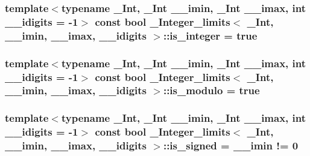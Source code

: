 \subsubsection[{is\+\_\+integer}]{\setlength{\rightskip}{0pt plus 5cm}template$<$typename \+\_\+\+Int, \+\_\+\+Int \+\_\+\+\_\+imin, \+\_\+\+Int \+\_\+\+\_\+imax, int \+\_\+\+\_\+idigits = -\/1$>$ const {\bf bool} {\bf \+\_\+\+Integer\+\_\+limits}$<$ \+\_\+\+Int, \+\_\+\+\_\+imin, \+\_\+\+\_\+imax, \+\_\+\+\_\+idigits $>$\+::is\+\_\+integer = {\bf true}\hspace{0.3cm}{\ttfamily [static]}}\label{class__Integer__limits_a912f15c4744dcbe94c9c98a09d144c59}
\hypertarget{class__Integer__limits_ad253b6f38a22b1584bbacf47fda759b3}{}
\subsubsection[{is\+\_\+modulo}]{\setlength{\rightskip}{0pt plus 5cm}template$<$typename \+\_\+\+Int, \+\_\+\+Int \+\_\+\+\_\+imin, \+\_\+\+Int \+\_\+\+\_\+imax, int \+\_\+\+\_\+idigits = -\/1$>$ const {\bf bool} {\bf \+\_\+\+Integer\+\_\+limits}$<$ \+\_\+\+Int, \+\_\+\+\_\+imin, \+\_\+\+\_\+imax, \+\_\+\+\_\+idigits $>$\+::is\+\_\+modulo = {\bf true}\hspace{0.3cm}{\ttfamily [static]}}\label{class__Integer__limits_ad253b6f38a22b1584bbacf47fda759b3}
\hypertarget{class__Integer__limits_a645510e27528070df3c346fde42335cb}{}
\subsubsection[{is\+\_\+signed}]{\setlength{\rightskip}{0pt plus 5cm}template$<$typename \+\_\+\+Int, \+\_\+\+Int \+\_\+\+\_\+imin, \+\_\+\+Int \+\_\+\+\_\+imax, int \+\_\+\+\_\+idigits = -\/1$>$ const {\bf bool} {\bf \+\_\+\+Integer\+\_\+limits}$<$ \+\_\+\+Int, \+\_\+\+\_\+imin, \+\_\+\+\_\+imax, \+\_\+\+\_\+idigits $>$\+::is\+\_\+signed = \+\_\+\+\_\+imin != 0\hspace{0.3cm}{\ttfamily [static]}}\label{class__Integer__limits_a645510e27528070df3c346fde42335cb}
\hypertarget{class__Integer__limits_a732d0d9a24623f683ec4376516224b69}{}
